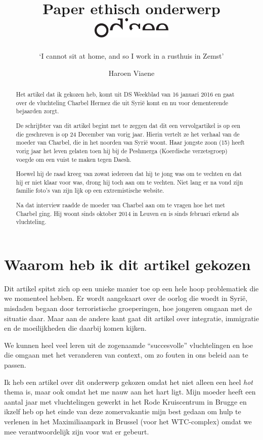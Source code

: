 \documentclass[12pt, a4paper]{paper}
\title{
\vspace{-2cm}
Paper ethisch onderwerp\\
\vspace{-1cm}
\hfill\includegraphics[height=1cm]{logo.pdf}}
\subtitle{`I cannot sit at home, and so I work in a rusthuis in Zemst'
\vspace{-.5cm}}
\author{
\vspace{-1cm}
\begin{large}
  Haroen Viaene
\end{large}
\vspace{-1cm}
}
\begin{document}
\maketitle

\begin{abstract}

Het artikel dat ik gekozen heb, komt uit DS Weekblad van 16 januari 2016 en gaat over de vluchteling Charbel Hermez die uit Syrië komt en nu voor dementerende bejaarden zorgt.

De schrijfster van dit artikel begint met te zeggen dat dit een vervolgartikel is op een die geschreven is op 24 December van vorig jaar. Hierin vertelt ze het verhaal van de moeder van Charbel, die in het noorden van Syrië woont. Haar jongste zoon (15) heeft vorig jaar het leven gelaten toen hij bij de Peshmerga (Koerdische verzetsgroep) voegde om een vuist te maken tegen Daesh.

Hoewel hij de raad kreeg van zowat iedereen dat hij te jong was om te vechten en dat hij er niet klaar voor was, drong hij toch aan om te vechten. Niet lang er na vond zijn familie foto's van zijn lijk op een extremistische website.

Na dat interview raadde de moeder van Charbel aan om te vragen hoe het met Charbel ging. Hij woont sinds oktober 2014 in Leuven en is sinds februari erkend als vluchteling.


\end{abstract}

\section{Waarom heb ik dit artikel gekozen}

Dit artikel spitst zich op een unieke manier toe op een hele hoop problematiek die we momenteel hebben. Er wordt aangekaart over de oorlog die woedt in Syrië, misdaden begaan door terroristische groeperingen, hoe jongeren omgaan met de situatie daar. Maar aan de andere kant gaat dit artikel over integratie, immigratie en de moeilijkheden die daarbij komen kijken.

We kunnen heel veel leren uit de zogenaamde ``succesvolle'' vluchtelingen en hoe die omgaan met het veranderen van context, om zo fouten in ons beleid aan te passen.

Ik heb een artikel over dit onderwerp gekozen omdat het niet alleen een heel \emph{hot} thema is, maar ook omdat het me nauw aan het hart ligt. Mijn moeder heeft een aantal jaar met vluchtelingen gewerkt in het Rode Kruiscentrum in Brugge en ikzelf heb op het einde van deze zomervakantie mijn best gedaan om hulp te verlenen in het Maximiliaanpark in Brussel (voor het WTC-complex) omdat we mee verantwoordelijk zijn voor wat er gebeurt.
\end{document}
